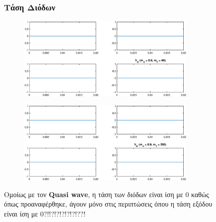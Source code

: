 \begin{figure}[h!]
	\subsubsection*{Τάση Διόδων}
	\begin{subfigure}{0.49\textwidth}
		\centering
		\includegraphics[width=0.95\textwidth]{Images/V_D_40}
	\end{subfigure}
	\begin{subfigure}{0.49\textwidth}
		\centering
		\includegraphics[width=0.95\textwidth]{Images/V_D_200}
	\end{subfigure}
	\noindent
	Ομοίως με τον \textbf{Quasi wave}, η τάση των διόδων είναι ίση με 0 καθώς όπως προαναφέρθηκε, άγουν μόνο στις περιπτώσεις όπου η τάση εξόδου είναι ίση με 0?!!?!?!?!?!?!??! 
\end{figure}

